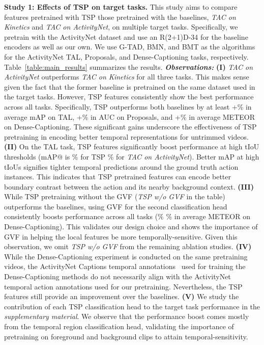 \documentclass[10pt,twocolumn,letterpaper]{article}
\begin{document}
\vspace{3pt}\noindent\textbf{Study 1: Effects of TSP on target tasks.}
This study aims to compare features pretrained with TSP \vs those pretrained with the baselines, \textit{TAC on Kinetics} and \textit{TAC on ActivityNet}, on multiple target tasks. Specifically, we pretrain with the ActivityNet dataset and use an R(2+1)D-34 for the baseline encoders as well as our own. We use G-TAD, BMN, and BMT as the algorithms for the ActivityNet TAL, Proposals, and Dense-Captioning tasks, respectively. Table~\ref{table:main_results} summarizes the results. 
\textit{\textbf{Observations:}}
\textbf{(I)} \textit{TAC on ActivityNet} outperforms \textit{TAC on Kinetics} for all three tasks. This makes sense given the fact that the former baseline is pretrained on the same dataset used in the target tasks. However, TSP features consistently show the best performance across all tasks. Specifically, TSP outperforms both baselines by at least +\% in average mAP on TAL, +\% in AUC on Proposals, and +\% in average METEOR on Dense-Captioning. These significant gains underscore the effectiveness of TSP pretraining in encoding better temporal representations for untrimmed videos. 
\textbf{(II)} On the TAL task, TSP features significantly boost performance at high tIoU thresholds (\eg mAP@ is \% for TSP \vs \% for \textit{TAC on ActivityNet}). Better mAP at high tIoUs signifies tighter temporal predictions around the ground truth action instances. This indicates that TSP pretrained features can encode better boundary contrast between the action and its nearby background context.
\textbf{(III)} While TSP pretraining without the GVF (\textit{TSP w/o GVF} in the table) outperforms the baselines, using GVF for the second classification head consistently boosts performance across all tasks (\eg \% \vs \% in average METEOR on Dense-Captioning). This validates our design choice and shows the importance of GVF in helping the local features be more temporally-sensitive. Given this observation, we omit \textit{TSP w/o GVF} from the remaining ablation studies.
\textbf{(IV)} While the Dense-Captioning experiment is conducted on the same pretraining videos, the ActivityNet Captions temporal annotations~\cite{activitynet_captions_dataset} used for training the Dense-Captioning methods do not necessarily align with the ActivityNet temporal action annotations used for our pretraining. Nevertheless, the TSP features still provide an improvement over the baselines.
\textbf{(V)} We study the contribution of each TSP classification head to the target task performance in the \emph{supplementary material}. We observe that the performance boost comes mostly from the temporal region classification head, validating the importance of pretraining on foreground and background clips to attain temporal-sensitivity.
\end{document}
